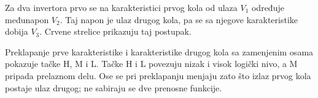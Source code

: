 Za dva invertora prvo se na karakteristici prvog kola od ulaza $V_1$ određuje međunapon $V_2$. Taj napon je ulaz drugog kola, pa se sa njegove karakteristike dobija $V_3$. Crvene strelice prikazuju taj postupak.

Preklapanje prve karakteristike i karakteristike drugog kola sa zamenjenim osama pokazuje tačke H, M i L. Tačke H i L povezuju nizak i visok logički nivo, a M pripada prelaznom delu. Ose se pri preklapanju menjaju zato što izlaz prvog kola postaje ulaz drugog; ne sabiraju se dve prenosne funkcije.
